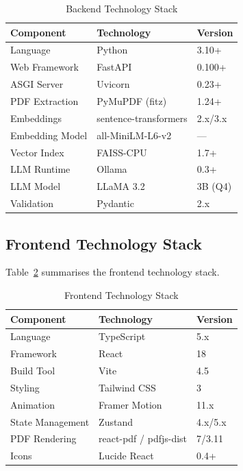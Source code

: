 \documentclass[conference]{IEEEtran}
\begin{document}
\begin{table}[h]
\caption{Backend Technology Stack}
\label{tab:backend}
\centering
\begin{tabular}{lll}
\toprule
\textbf{Component} & \textbf{Technology} & \textbf{Version} \\
\midrule
Language        & Python              & 3.10+   \\
Web Framework   & FastAPI             & 0.100+  \\
ASGI Server     & Uvicorn             & 0.23+   \\
PDF Extraction  & PyMuPDF (fitz)      & 1.24+   \\
Embeddings      & sentence-transformers & 2.x/3.x \\
Embedding Model & all-MiniLM-L6-v2   & ---     \\
Vector Index    & FAISS-CPU           & 1.7+    \\
LLM Runtime     & Ollama              & 0.3+    \\
LLM Model       & LLaMA 3.2           & 3B (Q4) \\
Validation      & Pydantic            & 2.x     \\
\bottomrule
\end{tabular}
\end{table}

\subsection{Frontend Technology Stack}
Table~\ref{tab:frontend} summarises the frontend technology stack.

\begin{table}[h]
\caption{Frontend Technology Stack}
\label{tab:frontend}
\centering
\begin{tabular}{lll}
\toprule
\textbf{Component}  & \textbf{Technology}       & \textbf{Version} \\
\midrule
Language            & TypeScript                & 5.x     \\
Framework           & React                     & 18      \\
Build Tool          & Vite                      & 4.5     \\
Styling             & Tailwind CSS              & 3       \\
Animation           & Framer Motion             & 11.x    \\
State Management    & Zustand                   & 4.x/5.x \\
PDF Rendering       & react-pdf / pdfjs-dist    & 7/3.11  \\
Icons               & Lucide React              & 0.4+    \\
\bottomrule
\end{tabular}
\end{table}
\end{document}
